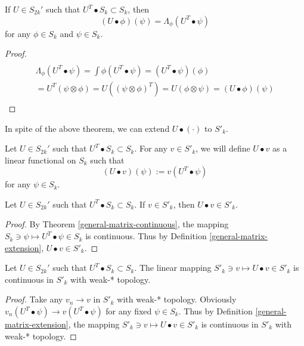 \documentclass[main.tex]{subfiles}
\begin{document}
\begin{theorem}
If $U\in S_{2k}'$ such that $U^T \bullet S_k \subset S_k$, then
\begin{equation}
(U\bullet\phi)(\psi) = \Lambda_\phi(U^T\bullet \psi)
\end{equation}
for any $\phi\in S_k$ and $\psi\in S_k$.
\end{theorem}
\begin{proof}
\begin{multline}\\
\Lambda_\phi(U^T\bullet \psi) = \int \phi (U^T \bullet \psi) = (U^T \bullet \psi)(\phi) \\ 
= U^T(\psi\otimes\phi) = U((\psi\otimes\phi)^T) = U(\phi\otimes\psi) = (U\bullet\phi)(\psi) \\
\end{multline}
\end{proof}
In spite of the above theorem, we can extend $U\bullet (\cdot)$ to $S'_k$.
\begin{definition}
\label{general-matrix-extension}
Let $U\in S_{2k}'$ such that $U^T \bullet S_k \subset S_k$. For any $v\in S'_k$, we will define $U\bullet v$ as a linear functional on $S_k$ such that
\begin{equation}
(U\bullet v)(\psi) := v(U^T\bullet \psi)
\end{equation} 
for any $\psi\in S_k$.
\end{definition}
\begin{theorem}
Let $U\in S_{2k}'$ such that $U^T \bullet S_k \subset S_k$. If $v\in S'_k$, then $U\bullet v\in S'_k$.
\end{theorem}
\begin{proof}
By Theorem \ref{general-matrix-continuous}, the mapping $S_k\ni\psi \mapsto U^T\bullet \psi\in S_k$ is continuous. Thus by Definition \ref{general-matrix-extension}, $U\bullet v\in S'_k$.
\end{proof}
\begin{theorem}
\label{rigorous-dirac-matrix-extension}
Let $U\in S_{2k}'$ such that $U^T \bullet S_k \subset S_k$. The linear mapping $S'_k\ni v \mapsto U\bullet v\in S'_k$ is continuous in $S'_k$ with weak-* topology.
\end{theorem}
\begin{proof}
Take any $v_n\to v$ in $S'_k$ with weak-* topology. Obviously $v_n(U^T\bullet \psi) \to v(U^T\bullet \psi)$ for any fixed $\psi\in S_k$. Thus by Definition \ref{general-matrix-extension}, the mapping $S'_k\ni v \mapsto U\bullet v\in S'_k$ is continuous in $S'_k$ with weak-* topology.
\end{proof}
\end{document}
